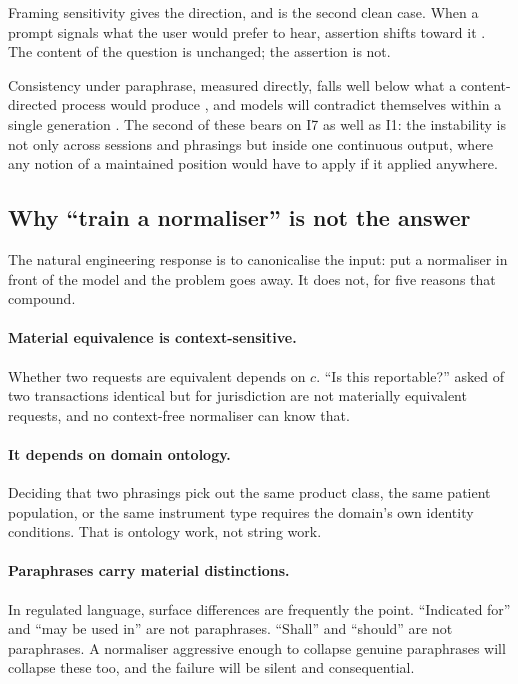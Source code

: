 Framing sensitivity gives the direction, and is the second clean case. When a prompt signals what the user
would prefer to hear, assertion shifts toward it \citep{sharma2024}. The content
of the question is unchanged; the assertion is not.

Consistency under paraphrase, measured directly, falls well below what a
content-directed process would produce \citep{elazar2021}, and models will
contradict themselves within a single generation \citep{mundler2024}. The second
of these bears on I7 as well as I1: the instability is not only across sessions
and phrasings but inside one continuous output, where any notion of a maintained
position would have to apply if it applied anywhere.

\subsection{Why ``train a normaliser'' is not the answer}
\label{sec:normaliser}

The natural engineering response is to canonicalise the input: put a normaliser in
front of the model and the problem goes away. It does not, for five reasons that
compound.

\paragraph{Material equivalence is context-sensitive.} Whether two requests are
equivalent depends on $c$. ``Is this reportable?'' asked of two transactions
identical but for jurisdiction are not materially equivalent requests, and no
context-free normaliser can know that.

\paragraph{It depends on domain ontology.} Deciding that two phrasings pick out the
same product class, the same patient population, or the same instrument type
requires the domain's own identity conditions. That is ontology work, not string
work.

\paragraph{Paraphrases carry material distinctions.} In regulated language, surface
differences are frequently the point. ``Indicated for'' and ``may be used in'' are
not paraphrases. ``Shall'' and ``should'' are not paraphrases. A normaliser
aggressive enough to collapse genuine paraphrases will collapse these too, and the
failure will be silent and consequential.

